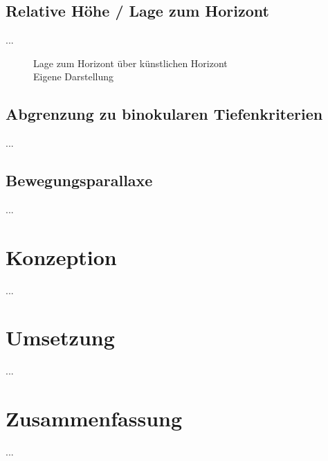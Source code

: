 \subsection{Relative Höhe / Lage zum Horizont}
...

\begin{figure}[!ht]
\centering
{}
\caption[Lage zum Horizont über künstlichen Horizont]{Lage zum Horizont über künstlichen Horizont\\ Eigene Darstellung}
\label{sample_lage_zum_horizont}
\end{figure}

\subsection{Abgrenzung zu binokularen Tiefenkriterien}
...

\subsection{Bewegungsparallaxe}
...

\section{Konzeption}
...

\section{Umsetzung}
...

\section{Zusammenfassung}
...